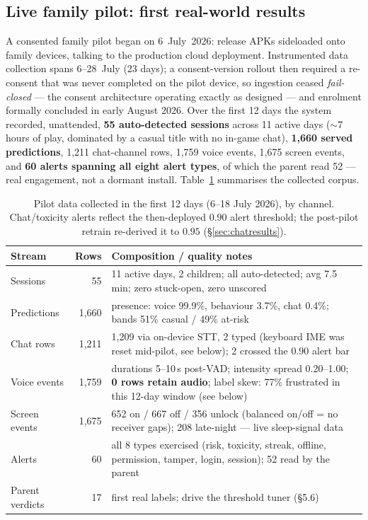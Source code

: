 \documentclass[11pt,a4paper]{article}
\begin{document}
\subsection{Live family pilot: first real-world results}
\label{sec:pilot}
A consented family pilot began on 6~July~2026: release APKs sideloaded onto family
devices, talking to the production cloud deployment. Instrumented data collection
spans 6--28~July (23 days); a consent-version rollout then required a re-consent
that was never completed on the pilot device, so ingestion ceased \emph{fail-closed}
--- the consent architecture operating exactly as designed --- and enrolment
formally concluded in early August 2026. Over the first 12 days the system
recorded, unattended, \textbf{55 auto-detected sessions} across 11 active days
($\sim$7 hours of play, dominated by a casual title with no in-game chat),
\textbf{1{,}660 served predictions}, 1{,}211 chat-channel rows, 1{,}759 voice events,
1{,}675 screen events, and \textbf{60 alerts spanning all eight alert types}, of which
the parent read 52 --- real engagement, not a dormant install. Table~\ref{tab:pilot}
summarises the collected corpus.

\begin{table}[ht]
\centering
\footnotesize
\caption{Pilot data collected in the first 12 days (6--18 July 2026), by channel.
Chat/toxicity alerts reflect the then-deployed $0.90$ alert threshold; the
post-pilot retrain re-derived it to $0.95$ (\S\ref{sec:chatresults}).}
\label{tab:pilot}
\begin{tabularx}{\linewidth}{@{}lrX@{}}
\toprule
\textbf{Stream} & \textbf{Rows} & \textbf{Composition / quality notes} \\
\midrule
Sessions & 55 & 11 active days, 2 children; all auto-detected; avg 7.5\,min;
zero stuck-open, zero unscored \\
Predictions & 1{,}660 & presence: voice 99.9\%, behaviour 3.7\%, chat 0.4\%;
bands 51\% casual / 49\% at-risk \\
Chat rows & 1{,}211 & 1{,}209 via on-device STT, 2 typed (keyboard IME was reset
mid-pilot, see below); 2 crossed the 0.90 alert bar \\
Voice events & 1{,}759 & durations 5--10\,s post-VAD; intensity spread 0.20--1.00;
\textbf{0 rows retain audio}; label skew: 77\% frustrated in this 12-day window (see below) \\
Screen events & 1{,}675 & 652 on / 667 off / 356 unlock (balanced on/off = no
receiver gaps); 208 late-night --- live sleep-signal data \\
Alerts & 60 & all 8 types exercised (risk, toxicity, streak, offline, permission,
tamper, login, session); 52 read by the parent \\
Parent verdicts & 17 & first real labels; drive the threshold tuner (\S5.6) \\
\bottomrule
\end{tabularx}
\end{table}
\end{document}

